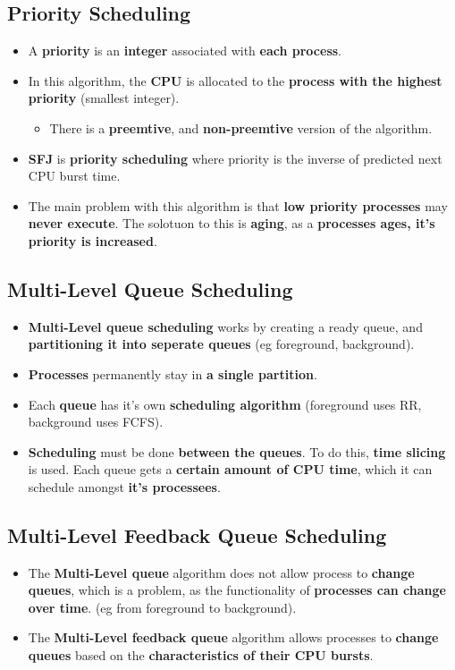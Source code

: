 \documentclass{article}
\begin{document}
    \subsection*{Priority Scheduling}
    \begin{itemize}
        \item A \textbf{priority} is an \textbf{integer} associated with \textbf{each process}.
        \item In this algorithm, the \textbf{CPU} is allocated to the \textbf{process with the highest priority} (smallest integer).
        \begin{itemize}
            \item There is a \textbf{preemtive}, and \textbf{non-preemtive} version of the algorithm.
        \end{itemize}
        \item \textbf{SFJ} is \textbf{priority scheduling} where priority is the inverse of predicted next CPU burst time.
        \item The main problem with this algorithm is that \textbf{low priority processes} may \textbf{never execute}. The solotuon to this is \textbf{aging}, as a \textbf{processes ages, it's priority is increased}.
    \end{itemize}

    \subsection*{Multi-Level Queue Scheduling}
    \begin{itemize}
        \item \textbf{Multi-Level queue scheduling} works by creating a ready queue, and \textbf{partitioning it into seperate queues} (eg foreground, background).
        \item \textbf{Processes} permanently stay in \textbf{a single partition}.
        \item Each \textbf{queue} has it's own \textbf{scheduling algorithm} (foreground uses RR, background uses FCFS).
        \item \textbf{Scheduling} must be done \textbf{between the queues}. To do this, \textbf{time slicing} is used. Each queue gets a \textbf{certain amount of CPU time}, which it can schedule amongst \textbf{it's processees}.
    \end{itemize}

    \subsection*{Multi-Level Feedback Queue Scheduling}
    \begin{itemize}
        \item The \textbf{Multi-Level queue} algorithm does not allow process to \textbf{change queues}, which is a problem, as the functionality of \textbf{processes can change over time}. (eg from foreground to background).
        \item The \textbf{Multi-Level feedback queue} algorithm allows processes to \textbf{change queues} based on the \textbf{characteristics of their CPU bursts}.
    \end{itemize}
\end{document}
